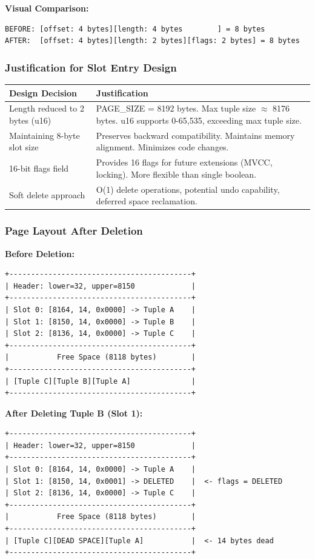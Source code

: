 \documentclass[11pt,a4paper]{article}
\begin{document}
\textbf{Visual Comparison:}
\begin{lstlisting}
BEFORE: [offset: 4 bytes][length: 4 bytes        ] = 8 bytes
AFTER:  [offset: 4 bytes][length: 2 bytes][flags: 2 bytes] = 8 bytes
\end{lstlisting}

\subsubsection{Justification for Slot Entry Design}

\begin{table}[H]
\centering
\small
\begin{tabular}{@{}p{}p{}@{}}
\toprule
\textbf{Design Decision} & \textbf{Justification} \\
\midrule
Length reduced to 2 bytes (u16) & PAGE\_SIZE = 8192 bytes. Max tuple size $\approx$ 8176 bytes. u16 supports 0-65,535, exceeding max tuple size. \\
Maintaining 8-byte slot size & Preserves backward compatibility. Maintains memory alignment. Minimizes code changes. \\
16-bit flags field & Provides 16 flags for future extensions (MVCC, locking). More flexible than single boolean. \\
Soft delete approach & O(1) delete operations, potential undo capability, deferred space reclamation. \\
\bottomrule
\end{tabular}
\end{table}

\subsubsection{Page Layout After Deletion}

\textbf{Before Deletion:}
\begin{lstlisting}
+------------------------------------------+
| Header: lower=32, upper=8150             |
+------------------------------------------+
| Slot 0: [8164, 14, 0x0000] -> Tuple A    |
| Slot 1: [8150, 14, 0x0000] -> Tuple B    |
| Slot 2: [8136, 14, 0x0000] -> Tuple C    |
+------------------------------------------+
|           Free Space (8118 bytes)        |
+------------------------------------------+
| [Tuple C][Tuple B][Tuple A]              |
+------------------------------------------+
\end{lstlisting}

\textbf{After Deleting Tuple B (Slot 1):}
\begin{lstlisting}
+------------------------------------------+
| Header: lower=32, upper=8150             |
+------------------------------------------+
| Slot 0: [8164, 14, 0x0000] -> Tuple A    |
| Slot 1: [8150, 14, 0x0001] -> DELETED    |  <- flags = DELETED
| Slot 2: [8136, 14, 0x0000] -> Tuple C    |
+------------------------------------------+
|           Free Space (8118 bytes)        |
+------------------------------------------+
| [Tuple C][DEAD SPACE][Tuple A]           |  <- 14 bytes dead
+------------------------------------------+
\end{lstlisting}
\end{document}
